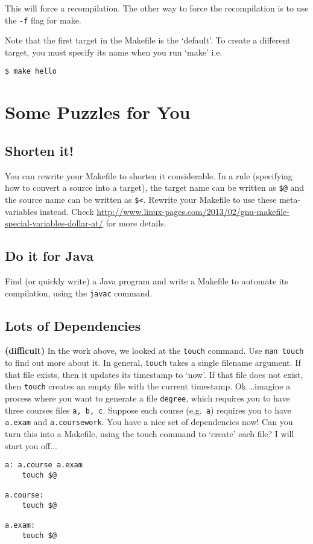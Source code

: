 \documentclass{article}
\begin{document}
This will force a recompilation. The other way to force the recompilation is to use the \texttt{-f} flag for make. 

Note that the first target in the Makefile is the `default'. To create a different target, you must specify its name when you run `make' i.e.
\begin{lstlisting}[style=BashInputStyle]
    $ make hello
\end{lstlisting}

\section*{Some Puzzles for You}

\subsection{Shorten it!}
You can rewrite your Makefile to shorten it considerable. In a rule (specifying how to convert a source into a target), the target name can be written as \verb+$@+ and the source name can be written as \verb+$<+. Rewrite your Makefile to use these meta-variables instead. Check \url{http://www.linux-pages.com/2013/02/gnu-makefile-special-variables-dollar-at/} for more details.

\subsection{Do it for Java}
Find (or quickly write) a Java program and write a Makefile to automate its compilation, using the \texttt{javac} command.

\subsection{Lots of Dependencies}
\textbf{(difficult)} In the work above, we looked at the \texttt{touch} command. Use \texttt{man touch} to find out more about it. In general, \texttt{touch} takes a single filename argument. If that file exists, then it updates its timestamp to `now'. If that file does not exist, then \texttt{touch} creates an empty file with the current timestamp. Ok \ldots imagine a process where you want to generate a file \texttt{degree}, which requires you to have three courses files \texttt{a, b, c}. Suppose each course (e.g.\ \texttt{a}) requires you to have \texttt{a.exam} and \texttt{a.coursework}. You have a nice set of dependencies now!  Can you turn this into a Makefile, using the touch command to `create' each file? I will start you off...


\begin{lstlisting}[style=MakeProg]
a: a.course a.exam
    touch $@

a.course:
    touch $@

a.exam:
    touch $@

\end{lstlisting}
\end{document}
